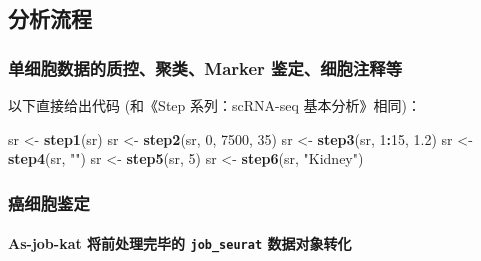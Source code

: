 \documentclass[
]{article}
\newenvironment{Shaded}{\begin{snugshade}}{\end{snugshade}}
\newcommand{\DecValTok}[1]{\textcolor[rgb]{0.00,0.00,0.81}{#1}}
\newcommand{\FloatTok}[1]{\textcolor[rgb]{0.00,0.00,0.81}{#1}}
\newcommand{\KeywordTok}[1]{\textcolor[rgb]{0.13,0.29,0.53}{\textbf{#1}}}
\newcommand{\NormalTok}[1]{#1}
\newcommand{\OperatorTok}[1]{\textcolor[rgb]{0.81,0.36,0.00}{\textbf{#1}}}
\newcommand{\StringTok}[1]{\textcolor[rgb]{0.31,0.60,0.02}{#1}}
\begin{document}
\hypertarget{ux5206ux6790ux6d41ux7a0b}{%
\subsection{分析流程}\label{ux5206ux6790ux6d41ux7a0b}}

\hypertarget{ux5355ux7ec6ux80deux6570ux636eux7684ux8d28ux63a7ux805aux7c7bmarker-ux9274ux5b9aux7ec6ux80deux6ce8ux91caux7b49}{%
\subsubsection{单细胞数据的质控、聚类、Marker 鉴定、细胞注释等}\label{ux5355ux7ec6ux80deux6570ux636eux7684ux8d28ux63a7ux805aux7c7bmarker-ux9274ux5b9aux7ec6ux80deux6ce8ux91caux7b49}}

以下直接给出代码 (和《Step 系列：scRNA-seq 基本分析》相同)：

\begin{Shaded}
\begin{Highlighting}[]
\NormalTok{sr \textless{}{-}}\StringTok{ }\KeywordTok{step1}\NormalTok{(sr)}
\NormalTok{sr \textless{}{-}}\StringTok{ }\KeywordTok{step2}\NormalTok{(sr, }\DecValTok{0}\NormalTok{, }\DecValTok{7500}\NormalTok{, }\DecValTok{35}\NormalTok{)}
\NormalTok{sr \textless{}{-}}\StringTok{ }\KeywordTok{step3}\NormalTok{(sr, }\DecValTok{1}\OperatorTok{:}\DecValTok{15}\NormalTok{, }\FloatTok{1.2}\NormalTok{)}
\NormalTok{sr \textless{}{-}}\StringTok{ }\KeywordTok{step4}\NormalTok{(sr, }\StringTok{""}\NormalTok{)}
\NormalTok{sr \textless{}{-}}\StringTok{ }\KeywordTok{step5}\NormalTok{(sr, }\DecValTok{5}\NormalTok{)}
\NormalTok{sr \textless{}{-}}\StringTok{ }\KeywordTok{step6}\NormalTok{(sr, }\StringTok{"Kidney"}\NormalTok{)}
\end{Highlighting}
\end{Shaded}

\hypertarget{ux764cux7ec6ux80deux9274ux5b9a}{%
\subsubsection{癌细胞鉴定}\label{ux764cux7ec6ux80deux9274ux5b9a}}

\hypertarget{as-job-kat-ux5c06ux524dux5904ux7406ux5b8cux6bd5ux7684-job_seurat-ux6570ux636eux5bf9ux8c61ux8f6cux5316}{%
\paragraph{\texorpdfstring{As-job-kat 将前处理完毕的 \texttt{job\_seurat} 数据对象转化}{As-job-kat 将前处理完毕的 job\_seurat 数据对象转化}}\label{as-job-kat-ux5c06ux524dux5904ux7406ux5b8cux6bd5ux7684-job_seurat-ux6570ux636eux5bf9ux8c61ux8f6cux5316}}
\end{document}
